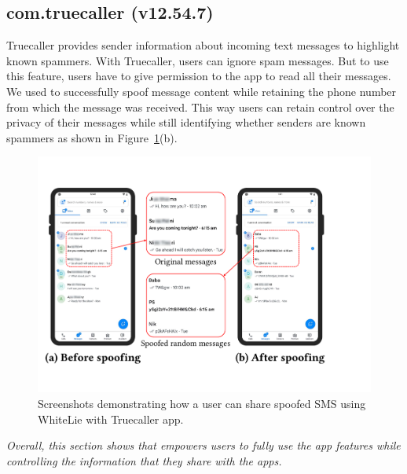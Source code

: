 \subsection{com.truecaller (v12.54.7)}
\label{sec:tc_case_study}
Truecaller provides sender information about incoming text messages to highlight
known spammers. With Truecaller, users can ignore spam messages. But to use
this feature, users have to give permission to the app to read all their
messages. 
We used \framework to successfully spoof message content while retaining the phone 
number from which the message was received.
This way users can retain control over the privacy of their messages 
while still identifying whether senders are known spammers as shown in
Figure~\ref{fig:case-study-truecaller}(b).

\begin{figure}[t]\centering
    \includegraphics[width=\linewidth]{Figures/Case Studies/truecaller_screenshots.pdf}
    \caption{Screenshots demonstrating how a user can share spoofed SMS using WhiteLie with Truecaller app.}
    \label{fig:case-study-truecaller}
\end{figure}

\textit{Overall, this section shows that \framework empowers users to fully use
the app features while controlling the information that they share with the
apps.}

